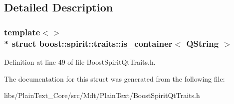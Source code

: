 \subsection{Detailed Description}
\subsubsection*{template$<$$>$\\*
struct boost\+::spirit\+::traits\+::is\+\_\+container$<$ Q\+String $>$}



Definition at line 49 of file Boost\+Spirit\+Qt\+Traits.\+h.



The documentation for this struct was generated from the following file\+:\begin{DoxyCompactItemize}
\item 
libs/\+Plain\+Text\+\_\+\+Core/src/\+Mdt/\+Plain\+Text/Boost\+Spirit\+Qt\+Traits.\+h\end{DoxyCompactItemize}
